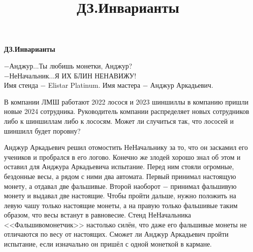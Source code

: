 \centerline{\bf \Huge ДЗ.Инварианты}
\title{ДЗ.Инварианты}

\begin{flushright}
    \scriptsize
    $-$Анджур...Ты любишь монетки, Анджур?\\
    $-$НеНачальник...Я ИХ БЛИН НЕНАВИЖУ!\\
    Имя стенда $-$ Elistar Platinum. Имя мастера $-$ Анджур Аркадьевич. 
    
\end{flushright}


В компании ЛМШ работают 2022 лосося и 2023 шиншиллы в компанию пришли новые 2024 сотрудника. Руководитель компании распределяет новых сотрудников либо к шиншиллам либо к лососям. Может ли случиться так, что лососей и шиншилл будет поровну?


Анджур Аркадьевич решил отомостить НеНачальнику за то, что он заскамил его учеников и пробрался в его логово. Конечно же злодей хорошо знал об этом и оставил для Анджура Аркадьевича испытание. Перед ним стояли огромные, бездонные весы, а рядом с ними два автомата. Первый принимал настоящую монету, а отдавал две фальшивые. Второй наоборот $-$ принимал фальшивую монету и выдавал две настоящие. Чтобы пройти дальше, нужно положить на левую чашу только настоящие монеты, а на правую только фальшивые таким образом, что весы встанут в равновесие. Стенд НеНачальника <<Фальшивомонетчик>> настолько силён, что даже его фальшивые монеты не отличаются по весу от настоящих. Сможет ли Анджур Аркадьевич пройти испытание, если изначально он пришёл с одной монеткой в кармане.